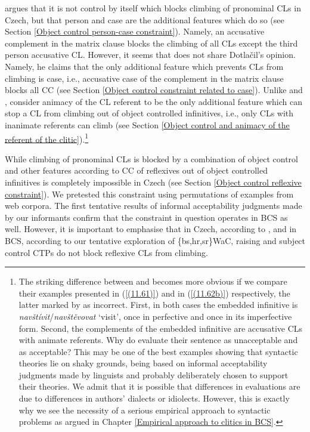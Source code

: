 \citet{Dotlacil04} argues that it is not control by itself which blocks climbing of pronominal CLs in Czech, but that person and case are the additional features which do so (see Section \ref{Object control person-case constraint}). Namely, an accusative complement in the matrix clause blocks the climbing of all CLs except the third person accusative CL. However, it seems that \citet{Rezac05} does not share Dotlačil’s opinion. Namely, he claims that the only additional feature which prevents CLs from climbing is case, i.e., accusative case of the complement in the matrix clause blocks all CC (see Section \ref{Object control constraint related to case}). Unlike \citet{Dotlacil04} and \citet{Rezac05}, \citet{LelandToman76} consider animacy of the CL referent to be the only additional feature which can stop a CL from climbing out of object controlled infinitives, i.e., only CLs with inanimate referents can climb (see Section \ref{Object control and animacy of the referent of the clitic}).\footnote{The striking difference between \citet{Dotlacil04} and \citet{LelandToman76} becomes more obvious if we compare their examples presented in (\ref{(11.61)}) and in (\ref{(11.62b)}) respectively, the latter marked by \citet[245]{LelandToman76} as incorrect. First, in both cases the embedded infinitive is \textit{navštívit}/\textit{navštěvovat} ‘visit’, once in perfective and once in its imperfective form. Second, the complements of the embedded infinitive are accusative CLs with animate referents. Why do \citet[245]{LelandToman76} evaluate their sentence as unacceptable and \citet[80]{Dotlacil04} as acceptable? This may be one of the best examples showing that syntactic theories lie on shaky grounds, being based on informal acceptability judgments made by linguists and probably deliberately chosen to support their theories. We admit that it is possible that differences in evaluations are due to differences in authors’ dialects or idiolects. However, this is exactly why we see the necessity of a serious empirical approach to syntactic problems as argued in Chapter \ref{Empirical approach to clitics in BCS}.}

While climbing of pronominal CLs is blocked by a combination of object control and other features according to \citet{Hana07} CC of reflexives out of object controlled infinitives is completely impossible in Czech (see Section \ref{Object control reflexive constraint}). We pretested this constraint using permutations of examples from web corpora. The first tentative results of informal acceptability judgments made by our informants confirm that the constraint in question operates in BCS as well. However, it is important to emphasise that in Czech, according to \citet{Hana07}, and in BCS, according to our tentative exploration of \{bs,hr,sr\}WaC, raising and subject control CTPs do not block reflexive CLs from climbing. 

